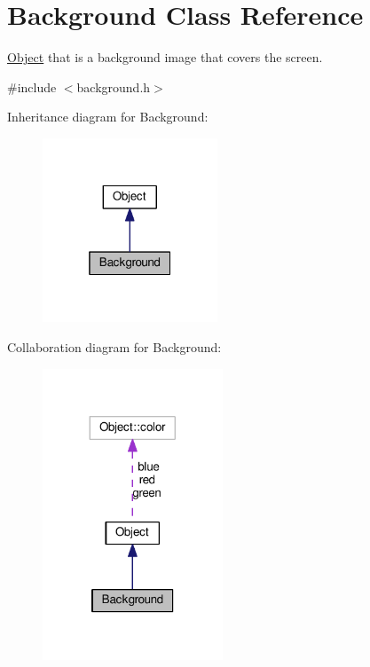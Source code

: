 \hypertarget{classBackground}{}\section{Background Class Reference}
\label{classBackground}


\hyperlink{classObject}{Object} that is a background image that covers the screen.  




{\ttfamily \#include $<$background.\+h$>$}



Inheritance diagram for Background\+:\nopagebreak
\begin{figure}[H]
\begin{center}
\leavevmode
\includegraphics[width=148pt]{classBackground__inherit__graph}
\end{center}
\end{figure}


Collaboration diagram for Background\+:\nopagebreak
\begin{figure}[H]
\begin{center}
\leavevmode
\includegraphics[width=152pt]{classBackground__coll__graph}
\end{center}
\end{figure}
